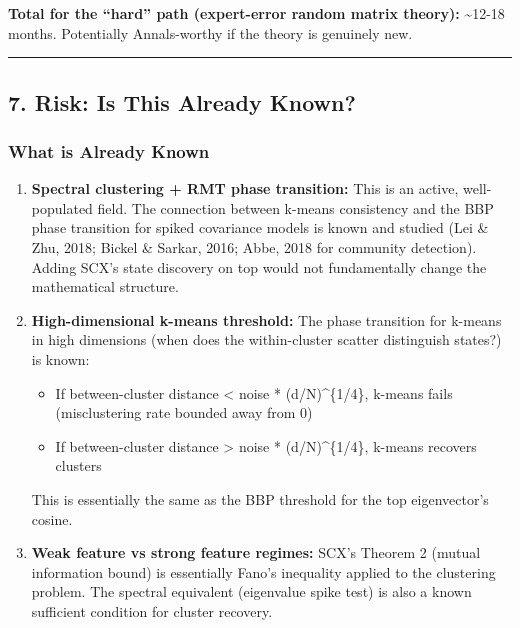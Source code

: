 \documentclass[
  12pt,
]{article}
\providecommand{\tightlist}{%
  \setlength{\itemsep}{0pt}\setlength{\parskip}{0pt}}
\begin{document}
\textbf{Total for the ``hard'' path (expert-error random matrix
theory):} \textasciitilde12-18 months. Potentially Annals-worthy if the
theory is genuinely new.

\begin{center}\rule{0.5\linewidth}{0.5pt}\end{center}

\subsection{7. Risk: Is This Already
Known?}\label{risk-is-this-already-known}

\subsubsection{What is Already Known}\label{what-is-already-known}

\begin{enumerate}
\def\labelenumi{\arabic{enumi}.}
\item
  \textbf{Spectral clustering + RMT phase transition:} This is an
  active, well-populated field. The connection between k-means
  consistency and the BBP phase transition for spiked covariance models
  is known and studied (Lei \& Zhu, 2018; Bickel \& Sarkar, 2016; Abbe,
  2018 for community detection). Adding SCX's state discovery on top
  would not fundamentally change the mathematical structure.
\item
  \textbf{High-dimensional k-means threshold:} The phase transition for
  k-means in high dimensions (when does the within-cluster scatter
  distinguish states?) is known:

  \begin{itemize}
  \tightlist
  \item
    If between-cluster distance \textless{} noise * (d/N)\^{}\{1/4\},
    k-means fails (misclustering rate bounded away from 0)
  \item
    If between-cluster distance \textgreater{} noise * (d/N)\^{}\{1/4\},
    k-means recovers clusters
  \end{itemize}

  This is essentially the same as the BBP threshold for the top
  eigenvector's cosine.
\item
  \textbf{Weak feature vs strong feature regimes:} SCX's Theorem 2
  (mutual information bound) is essentially Fano's inequality applied to
  the clustering problem. The spectral equivalent (eigenvalue spike
  test) is also a known sufficient condition for cluster recovery.
\end{enumerate}
\end{document}
